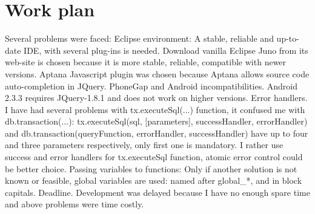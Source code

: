 \section {Work plan}

Several problems were faced:
Eclipse environment: A stable, reliable and up-to-date IDE, with several plug-ins is needed. Download vanilla Eclipse Juno from its web-site is chosen because it is more stable, reliable, compatible with newer versions.  Aptana Javascript plugin was chosen because Aptana allows source code auto-completion in JQuery.
PhoneGap and Android incompatibilities. Android 2.3.3 requires JQuery-1.8.1 and does not work on higher versions. 
Error handlers. I have had several problems with tx.executeSql(...) function, it confused me with db.transaction(...): 
tx.executeSql(sql, [parameters],  successHandler, errorHandler)
and
db.transaction(queryFunction, errorHandler, successHandler)  
have up to four and three parameters respectively, only first one is mandatory. I rather use success and error handlers for tx.executeSql function, atomic error control could be better choice.
Passing variables to functions: Only if another solution is not known or feasible, global variables are used: named after global_*, and in block capitals.
Deadline. Development was delayed because I have no enough spare time and above problems were time costly.


